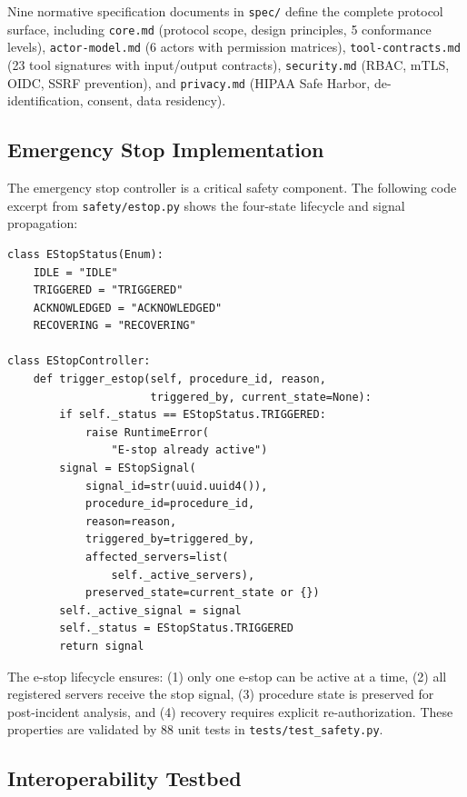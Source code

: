 \documentclass{article}
\begin{document}
Nine normative specification documents in \texttt{spec/} define the complete protocol surface, including \texttt{core.md} (protocol scope, design principles, 5 conformance levels), \texttt{actor-model.md} (6 actors with permission matrices), \texttt{tool-contracts.md} (23 tool signatures with input/output contracts), \texttt{security.md} (RBAC, mTLS, OIDC, SSRF prevention), and \texttt{privacy.md} (HIPAA Safe Harbor, de-identification, consent, data residency).

\subsection{Emergency Stop Implementation}

The emergency stop controller is a critical safety component. The following code excerpt from \texttt{safety/estop.py} shows the four-state lifecycle and signal propagation:

\begin{lstlisting}[caption={Emergency stop lifecycle from \texttt{safety/estop.py}.},label={lst:estop}]
class EStopStatus(Enum):
    IDLE = "IDLE"
    TRIGGERED = "TRIGGERED"
    ACKNOWLEDGED = "ACKNOWLEDGED"
    RECOVERING = "RECOVERING"

class EStopController:
    def trigger_estop(self, procedure_id, reason,
                      triggered_by, current_state=None):
        if self._status == EStopStatus.TRIGGERED:
            raise RuntimeError(
                "E-stop already active")
        signal = EStopSignal(
            signal_id=str(uuid.uuid4()),
            procedure_id=procedure_id,
            reason=reason,
            triggered_by=triggered_by,
            affected_servers=list(
                self._active_servers),
            preserved_state=current_state or {})
        self._active_signal = signal
        self._status = EStopStatus.TRIGGERED
        return signal
\end{lstlisting}

The e-stop lifecycle ensures: (1) only one e-stop can be active at a time, (2) all registered servers receive the stop signal, (3) procedure state is preserved for post-incident analysis, and (4) recovery requires explicit re-authorization. These properties are validated by 88 unit tests in \texttt{tests/test\_safety.py}.

\subsection{Interoperability Testbed}
\end{document}
